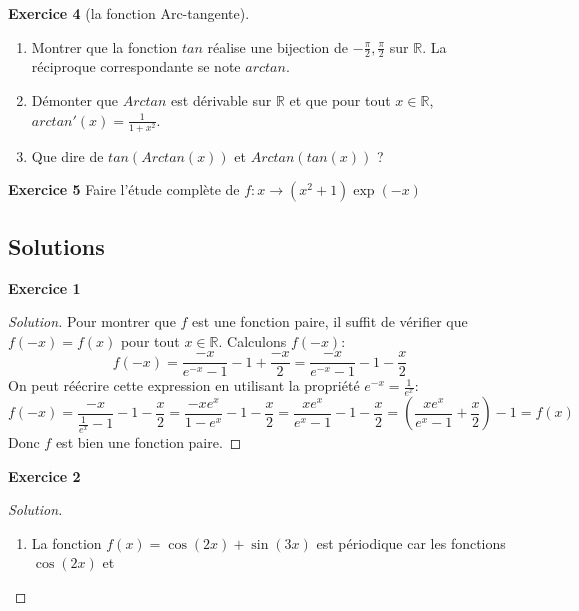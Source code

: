 \documentclass{report} %
\theoremstyle{definition}  %
\theoremstyle{plain} %
\theoremstyle{remark} %
\begin{document}
\noindent
\textbf{Exercice 4} 
(la fonction Arc-tangente).
\begin{enumerate}
\item Montrer que la fonction \(tan\) réalise une bijection de \(-\frac{\pi}{2}, \frac{\pi}{2}\) sur \(\mathbb{R}\). La réciproque correspondante se note \(arctan\).
\item Démonter que \(Arctan\) est dérivable sur \(\mathbb{R}\) et que pour tout \(x \in \mathbb{R}\), \(arctan'(x) = \frac{1}{1+x^2}\).
\item Que dire de \(tan(Arctan(x))\) et \(Arctan(tan(x))\) ?
\end{enumerate}
\medskip

\noindent
\textbf{Exercice 5}
Faire l'étude complète de \(f: x \to (x^2 + 1)\exp(-x)\)
\medskip

\subsection{\textbf{Solutions}}
\noindent
\textbf{Exercice 1}
\begin{proof}[Solution]
Pour montrer que \(f\) est une fonction paire,
il suffit de vérifier que \(f(-x) = f(x)\) pour tout \(x \in \mathbb{R}\).
Calculons \(f(-x)\):
\[
f(-x) = \frac{-x}{e^{-x} - 1} - 1 + \frac{-x}{2} = \frac{-x}{e^{-x} - 1} - 1 - \frac{x}{2}
\]
On peut réécrire cette expression en utilisant la propriété \(e^{-x} = \frac{1}{e^x}\):
\[
f(-x) = \frac{-x}{\frac{1}{e^x} - 1} - 1 - \frac{x}{2}
= \frac{-x e^x}{1 - e^x} - 1 - \frac{x}{2}
= \frac{x e^x}{e^x - 1} - 1 - \frac{x}{2}
= \left(\frac{x e^x}{e^x - 1} + \frac{x}{2}\right) - 1
= f(x)
\]
Donc \(f\) est bien une fonction paire.
\end{proof}
\medskip
\noindent
\textbf{Exercice 2}
\begin{proof}[Solution]
\begin{enumerate}
\item La fonction \(f(x) = \cos(2x) + \sin(3x)\) est périodique car les fonctions \(\cos(2x)\) et
\end{enumerate}
\end{proof}
\end{document}
